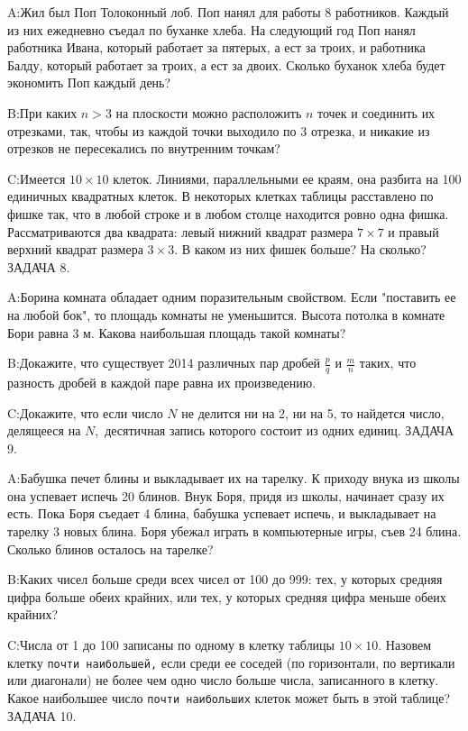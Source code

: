 \documentclass[10pt]{scrbook} \usepackage{modules/nonstahp_book}
\begin{document}
A:\qquad Жил был Поп Толоконный лоб. Поп нанял для работы 8 работников. Каждый из них ежедневно съедал по буханке хлеба. На следующий год Поп нанял работника Ивана, который работает за пятерых, а ест за троих, и работника Балду, который работает за троих, а ест за двоих. Сколько буханок хлеба будет экономить Поп каждый день?

B:\qquad При каких $n>3$ на плоскости можно расположить $n$ точек и соединить их отрезками, так, чтобы из каждой точки выходило по 3 отрезка, и никакие из отрезков не пересекались по внутренним точкам?

C:\qquad Имеется $10\times 10$ клеток. Линиями, параллельными ее краям, она разбита на 100 единичных квадратных клеток. В некоторых клетках таблицы расставлено по фишке так, что в любой строке и в любом столце находится ровно одна фишка. Рассматриваются два квадрата: левый нижний квадрат размера $7\times 7$ и правый верхний квадрат размера $3\times 3.$ В каком из них фишек больше? На сколько?
\medbreak
\noindent
ЗАДАЧА 8.

A:\qquad Борина комната обладает одним поразительным свойством. Если "поставить ее на любой  бок", то площадь комнаты не уменьшится. Высота потолка в комнате Бори равна 3 м. Какова наибольшая площадь такой комнаты?

B:\qquad Докажите, что существует 2014 различных пар дробей $\frac{p}{q}$ и $\frac{m}{n}$ таких, что разность дробей в каждой паре равна их произведению.

C:\qquad Докажите, что если число $N$ не делится ни на 2, ни на 5, то найдется число, делящееся на $N,$ десятичная запись которого состоит из одних единиц.
\medbreak
\noindent
ЗАДАЧА 9.

A:\qquad Бабушка печет блины и выкладывает их на тарелку. К приходу внука из школы она успевает испечь 20 блинов. Внук Боря, придя из школы, начинает сразу их есть. Пока Боря съедает 4 блина, бабушка успевает испечь, и выкладывает на тарелку  3 новых блина. Боря убежал играть в компьютерные игры, съев 24 блина. Сколько блинов осталось на тарелке?

B:\qquad Каких чисел больше среди всех чисел от 100 до 999: тех, у которых средняя цифра больше обеих крайних, или тех, у которых средняя цифра меньше обеих крайних?

C:\qquad Числа от 1 до 100 записаны по одному в клетку таблицы $10\times 10.$  Назовем клетку {\tt почти наибольшей,} если среди ее соседей (по горизонтали, по вертикали или диагонали) не более чем одно число больше числа, записанного в клетку. Какое наибольшее число {\tt почти наибольших} клеток может быть в этой таблице?
\medbreak
\noindent
ЗАДАЧА 10.
\end{document}
